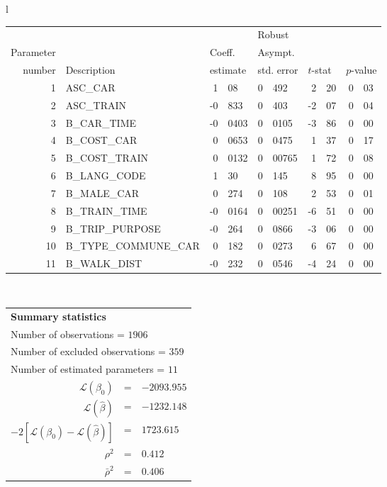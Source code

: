   \begin{tabular}{l}
\begin{tabular}{rlr@{.}lr@{.}lr@{.}lr@{.}l}
         &                       &   \multicolumn{2}{l}{}    & \multicolumn{2}{l}{Robust}  &     \multicolumn{4}{l}{}   \\
Parameter &                       &   \multicolumn{2}{l}{Coeff.}      & \multicolumn{2}{l}{Asympt.}  &     \multicolumn{4}{l}{}   \\
number &  Description                     &   \multicolumn{2}{l}{estimate}      & \multicolumn{2}{l}{std. error}  &   \multicolumn{2}{l}{$t$-stat}  &   \multicolumn{2}{l}{$p$-value}   \\

\hline

1 & ASC_CAR & 1&08 & 0&492 & 2&20 & 0&03\\
2 & ASC_TRAIN & -0&833 & 0&403 & -2&07 & 0&04\\
3 & B_CAR_TIME & -0&0403 & 0&0105 & -3&86 & 0&00\\
4 & B_COST_CAR & 0&0653 & 0&0475 & 1&37 & 0&17\\
5 & B_COST_TRAIN & 0&0132 & 0&00765 & 1&72 & 0&08\\
6 & B_LANG_CODE & 1&30 & 0&145 & 8&95 & 0&00\\
7 & B_MALE_CAR & 0&274 & 0&108 & 2&53 & 0&01\\
8 & B_TRAIN_TIME & -0&0164 & 0&00251 & -6&51 & 0&00\\
9 & B_TRIP_PURPOSE & -0&264 & 0&0866 & -3&06 & 0&00\\
10 & B_TYPE_COMMUNE_CAR & 0&182 & 0&0273 & 6&67 & 0&00\\
11 & B_WALK_DIST & -0&232 & 0&0546 & -4&24 & 0&00\\
\hline
\end{tabular}
\\
\begin{tabular}{rcl}
\multicolumn{3}{l}{\bf Summary statistics}\\
\multicolumn{3}{l}{ Number of observations = $1906$} \\
\multicolumn{3}{l}{ Number of excluded observations = $359$} \\
\multicolumn{3}{l}{ Number of estimated  parameters = $11$} \\
 $\mathcal{L}(\beta_0)$ &=&  $-2093.955$ \\
 $\mathcal{L}(\hat{\beta})$ &=& $-1232.148 $  \\
 $-2[\mathcal{L}(\beta_0) -\mathcal{L}(\hat{\beta})]$ &=& $1723.615$ \\
    $\rho^2$ &=&   $0.412$ \\
    $\bar{\rho}^2$ &=&    $0.406$ \\
\end{tabular}
  \end{tabular}
